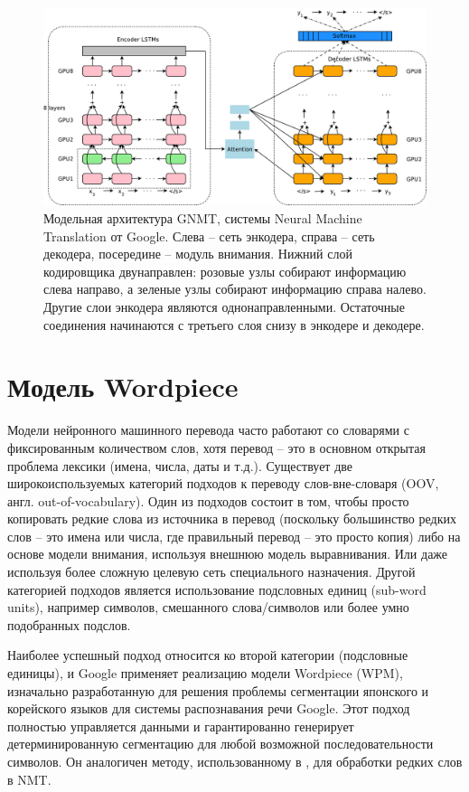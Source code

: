\documentclass[12pt, a4paper]{article}
\begin{document}
        \begin{figure}
            \centering
            \includegraphics[width=\textwidth]{arch.png}
            \caption{Модельная архитектура GNMT, системы Neural Machine Translation от Google. Слева -- сеть энкодера, справа -- сеть декодера, посередине -- модуль внимания. Нижний слой кодировщика двунаправлен: розовые узлы собирают информацию слева направо, а зеленые узлы собирают информацию справа налево. Другие слои энкодера являются однонаправленными. Остаточные соединения начинаются с третьего слоя снизу в энкодере и декодере.}
            \label{fig:arch}
        \end{figure}

    \section{Модель Wordpiece}
        Модели нейронного машинного перевода часто работают со словарями с фиксированным количеством слов, хотя перевод -- это в основном открытая проблема лексики (имена, числа, даты и т.д.). Существует две широкоиспользуемых категорий подходов к переводу слов-вне-словаря (OOV, англ. out-of-vocabulary). Один из подходов состоит в том, чтобы просто копировать редкие слова из источника в перевод (поскольку большинство редких слов -- это имена или числа, где правильный перевод -- это просто копия) либо на основе модели внимания, используя внешнюю модель выравнивания. Или даже используя более сложную целевую сеть специального назначения. Другой категорией подходов является использование подсловных единиц (sub-word units), например символов, смешанного слова/символов или более умно подобранных подслов.

        Наиболее успешный подход относится ко второй категории (подсловные единицы), и Google применяет реализацию модели Wordpiece (WPM), изначально разработанную для решения проблемы сегментации японского и корейского языков для системы распознавания речи Google. Этот подход полностью управляется данными и гарантированно генерирует детерминированную сегментацию для любой возможной последовательности символов. Он аналогичен методу, использованному в \cite{subword}, для обработки редких слов в NMT.
\end{document}
